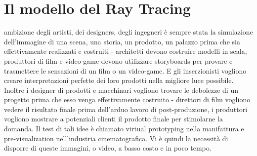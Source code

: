 \documentclass[9pt,a4paper,twoside]{tau}
\begin{document}
\section{Il modello del Ray Tracing}
ambizione degli artisti, dei designers, degli ingegneri è sempre stata la simulazione dell'immagine di una scena, una storia, un prodotto, un palazzo prima che sia effettivamente realizzati e costruiti - architetti devono costruire modelli in scala, produttori di film e video-game devono utilizzare storyboards per provare e trasmettere le sensazioni di un film o un video-game. E gli inserzionisti vogliono creare interpretazioni perfette dei loro prodotti nella migliore luce possibile. Inoltre i designer di prodotti e macchinari vogliono trovare le debolezze di un progetto prima che esso venga effettivamente costruito - direttori di film vogliono vedere il risultato finale prima dell'arduo lavoro di post-produzione, i produttori vogliono mostrare a potenziali clienti il prodotto finale per stimolarne la domanda. Il test di tali idee è chiamato virtual prototyping nella manifattura e pre-visualization nell'industria cinematografica. Vi è quindi la necessità di disporre di queste immagini, o video, a basso costo e in poco tempo.\\
\end{document}
